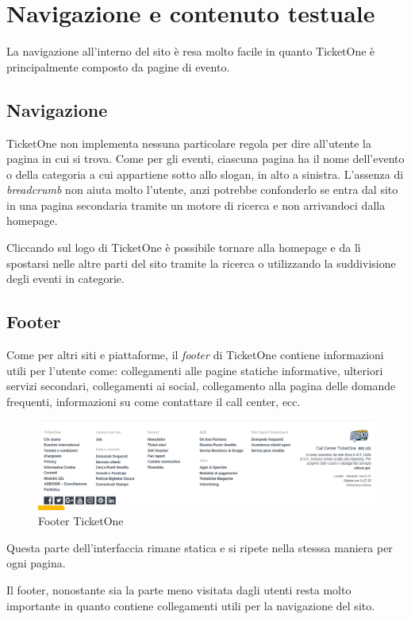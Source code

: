 \section{Navigazione e contenuto testuale}\label{contenav}

La navigazione all'interno del sito è resa molto facile in quanto TicketOne è principalmente composto da pagine di evento.

\subsection{Navigazione}
	TicketOne non implementa nessuna particolare regola per dire all'utente la pagina in cui si trova.
	Come per gli eventi, ciascuna pagina ha il nome dell'evento o della categoria a cui appartiene sotto allo slogan, in alto a sinistra.
	L'assenza di \textit{breadcrumb} non aiuta molto l'utente, anzi potrebbe confonderlo se entra dal sito in una pagina secondaria tramite un motore di ricerca e non arrivandoci dalla homepage.
	\par Cliccando sul logo di TicketOne è possibile tornare alla homepage e da lì spostarsi nelle altre parti del sito tramite la ricerca o utilizzando la suddivisione degli eventi in categorie.

\subsection{Footer}
	Come per altri siti e piattaforme, il \textit{footer} di TicketOne contiene informazioni utili per l'utente come: collegamenti alle pagine statiche informative, ulteriori servizi secondari, collegamenti ai social, collegamento alla pagina delle domande frequenti, informazioni su come contattare il call center, ecc.

	\begin{figure}[hbt]
		\centering
		\includegraphics[width=\textwidth]{img/footer.png}
		\caption{Footer TicketOne}
		\label{footer}
	\end{figure}

	Questa parte dell'interfaccia rimane statica e si ripete nella stesssa maniera per ogni pagina.
	\par Il footer, nonostante sia la parte meno visitata dagli utenti resta molto importante in quanto contiene collegamenti utili per la navigazione del sito.

